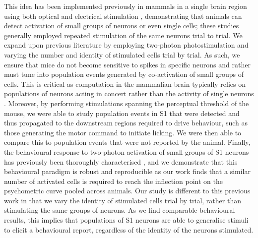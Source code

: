 This idea has been implemented previously in mammals in a single brain region using both optical \cite{huber_sparse_2008, histed_cortical_2014, gill_precise_2020, dalgleish_how_2020} and electrical stimulation \cite{romo_somatosensory_1998, houweling_behavioural_2008, doron_spiking_2014, tanke_single-cell_2018, buchan_stimulation_2018}, demonstrating that animals can detect activation of small groups of neurons or even single cells; these studies generally employed repeated stimulation of the same neurons trial to trial. We expand upon previous literature by employing two-photon photostimulation and varying the number and identity of stimulated cells trial by trial. As such, we ensure that mice do not become sensitive to spikes in specific neurons and rather must tune into population events generated by co-activation of small groups of cells. This is critical as computation in the mammalian brain typically relies on populations of neurons acting in concert rather than the activity of single neurons \cite{averbeck_neural_2006}. Moreover, by performing stimulations spanning the perceptual threshold of the mouse, we were able to study population events in S1 that were detected and thus propagated to the downstream regions required to drive behaviour, such as those generating the motor command to initiate licking. We were then able to compare this to population events that were not reported by the animal. Finally, the behavioural response to two-photon activation of small groups of  S1 neurons has previously been thoroughly characterised \cite{dalgleish_how_2020}, and we demonstrate that this behavioural paradigm is robust and reproducible as our work finds that a similar number of activated cells is required to reach the inflection point on the psychometric curve pooled across animals. Our study is different to this previous work in that we vary the identity of stimulated cells trial by trial, rather than stimulating the same groups of neurons. As we find comparable behavioural results, this implies that populations of S1 neurons are able to generalise stimuli to elicit a behavioural report, regardless of the identity of the neurons stimulated.

